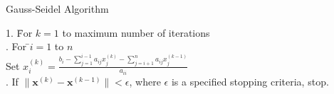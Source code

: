\documentclass[a4paper]{report}
\renewcommand{\vec}[1]{\boldsymbol{#1}}
\begin{document}
\begin{algorithm}
\caption{Gauss-Seidel Algorithm}

\begin{tabbing}
1. \=For $k=1$ to maximum number of iterations\\
. For \=$i=1$ to $n$\\
\>\>Set
\begin{math}
x_i^{(k)} = \frac{b_i-\sum_{j=1}^{i-1}a_{ij}x_j^{(k)}-\sum_{j=i+1}^{n}a_{ij}x_j^{(k-1)}}{a_{ii}}
\end{math}
\\
. If $\|\vec{x}^{(k)}-\vec{x}^{(k-1)}\| < \epsilon$, where $\epsilon$ is a specified stopping criteria, stop.
\end{tabbing}
\end{algorithm}
\end{document}
